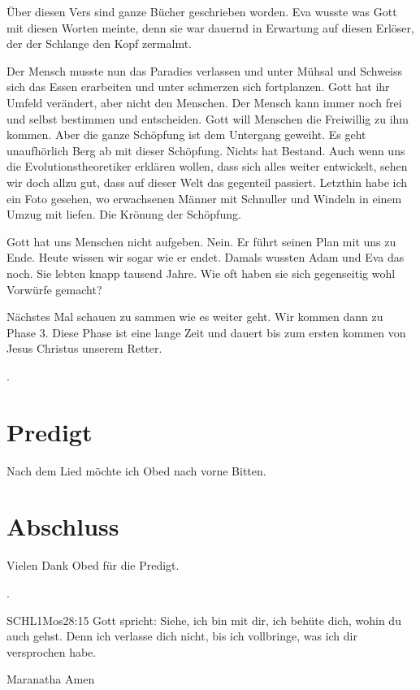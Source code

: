 \documentclass{../../inc/mybib}
\begin{document}
\begin{spacing}{1.5}
\begin{block}
        Über diesen Vers sind ganze Bücher geschrieben worden. Eva wusste was Gott mit diesen Worten meinte, denn sie war dauernd in Erwartung auf diesen Erlöser, der der Schlange den Kopf zermalmt. 
    \end{block} 
    \begin{block}
        Der Mensch musste nun das Paradies verlassen und unter Mühsal und Schweiss sich das Essen erarbeiten und unter schmerzen sich fortplanzen.  Gott hat ihr Umfeld verändert, aber nicht den Menschen. Der Mensch kann immer noch frei und selbst bestimmen und entscheiden. Gott will Menschen die Freiwillig zu ihm kommen. Aber die ganze Schöpfung ist dem Untergang geweiht. Es geht unaufhörlich Berg ab mit dieser Schöpfung. Nichts hat Bestand. Auch wenn uns die Evolutionstheoretiker erklären wollen, dass sich alles weiter entwickelt, sehen wir doch allzu gut, dass auf dieser Welt das gegenteil passiert. Letzthin habe ich ein Foto gesehen, wo erwachsenen Männer mit Schnuller und Windeln in einem Umzug mit liefen. Die Krönung der Schöpfung.
    \end{block}
    \begin{block}
        Gott hat uns Menschen nicht aufgeben. Nein. Er führt seinen Plan mit uns zu Ende. Heute wissen wir sogar wie er endet. Damals wussten Adam und Eva das noch. Sie lebten knapp tausend Jahre. Wie oft haben sie sich gegenseitig wohl Vorwürfe gemacht?
    \end{block}
    \begin{block}
        Nächstes Mal schauen zu sammen wie es weiter geht. Wir kommen dann zu Phase 3. Diese Phase ist eine lange Zeit und dauert bis zum ersten kommen von Jesus Christus unserem Retter.
    \end{block}
    
    
\end{spacing}
.

\section{Predigt}
Nach dem Lied möchte ich Obed nach vorne Bitten.

\section{Abschluss}
Vielen Dank Obed für die Predigt.

.

\beten{}

\begin{bibelbox}{SCHL}{1Mos}{28:15}
    Gott spricht: Siehe, ich bin mit dir,
    ich behüte dich, wohin du auch gehst.
    Denn ich verlasse dich nicht,
    bis ich vollbringe, was ich dir versprochen habe.
\end{bibelbox}

Maranatha Amen
\end{document}
